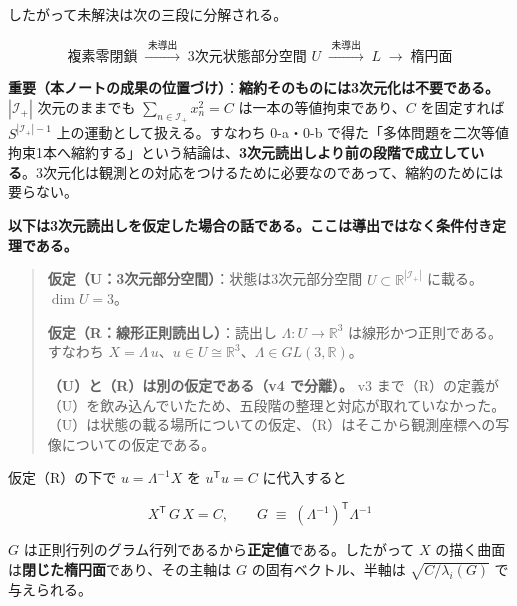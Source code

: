\documentclass[
  10pt,
]{ltjsarticle}
\begin{document}
したがって未解決は次の三段に分解される。

\[\text{複素零閉鎖} \;\xrightarrow{\;\text{未導出}\;}\; \text{3次元状態部分空間 }U \;\xrightarrow{\;\text{未導出}\;}\; L \;\longrightarrow\; \text{楕円面}\]

\textbf{重要（本ノートの成果の位置づけ）}：\textbf{縮約そのものには3次元化は不要である。}
\(|\mathcal{I}_+|\) 次元のままでも
\(\sum_{n\in \mathcal{I}_+}x_n^2 = C\) は一本の等値拘束であり、\(C\)
を固定すれば \(S^{|\mathcal{I}_+|-1}\) 上の運動として扱える。すなわち
0-a・0-b
で得た「多体問題を二次等値拘束1本へ縮約する」という結論は、\textbf{3次元読出しより前の段階で成立している}。3次元化は観測との対応をつけるために必要なのであって、縮約のためには要らない。

\textbf{以下は3次元読出しを仮定した場合の話である。ここは導出ではなく条件付き定理である。}

\begin{quote}
\textbf{仮定（U：3次元部分空間）}：状態は3次元部分空間
\(U \subset \mathbb{R}^{|\mathcal{I}_+|}\) に載る。\(\dim U = 3\)。

\textbf{仮定（R：線形正則読出し）}：読出し
\(\Lambda : U \to \mathbb{R}^3\) は線形かつ正則である。すなわち
\(X = \Lambda\,u\)、\(u \in U \cong \mathbb{R}^3\)、\(\Lambda \in GL(3,\mathbb{R})\)。

\textbf{（U）と（R）は別の仮定である（v4 で分離）。} v3
まで（R）の定義が（U）を飲み込んでいたため、五段階の整理と対応が取れていなかった。（U）は状態の載る場所についての仮定、（R）はそこから観測座標への写像についての仮定である。
\end{quote}

仮定（R）の下で \(u = \Lambda^{-1}X\) を \(u^{\mathsf T}u = C\)
に代入すると

\[X^{\mathsf T}\,G\,X = C, \qquad G \;\equiv\; (\Lambda^{-1})^{\mathsf T}\Lambda^{-1}\]

\(G\) は正則行列のグラム行列であるから\textbf{正定値}である。したがって
\(X\) の描く曲面は\textbf{閉じた楕円面}であり、その主軸は \(G\)
の固有ベクトル、半軸は \(\sqrt{C/\lambda_i(G)}\) で与えられる。
\end{document}
